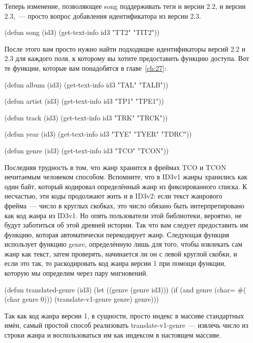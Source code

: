 Теперь изменение, позволяющее song поддерживать теги и версии 2.2, и версии 2.3,~--- просто
вопрос добавления идентификатора из версии 2.3.

\begin{myverb}
(defun song (id3) (get-text-info id3 "TT2" "TIT2"))
\end{myverb}

После этого вам просто нужно найти подходящие идентификаторы версий 2.2 и 2.3 для каждого
поля, к которому вы хотите предоставить функцию доступа. Вот те функции, которые вам
понадобятся в главе~\ref{ch:27}:

\begin{myverb}
(defun album (id3) (get-text-info id3 "TAL" "TALB"))

(defun artist (id3) (get-text-info id3 "TP1" "TPE1"))

(defun track (id3) (get-text-info id3 "TRK" "TRCK"))

(defun year (id3) (get-text-info id3 "TYE" "TYER" "TDRC"))

(defun genre (id3) (get-text-info id3 "TCO" "TCON"))
\end{myverb}

Последняя трудность в том, что жанр хранится в фреймах TCO и TCON нечи\-тае\-мым человеком
способом. Вспомните, что в ID3v1 жанры хранились как один байт, который кодировал
определённый жанр из фиксированного списка. К несчастью, эти коды продолжают жить и в
ID3v2: если текст жанрового фрейма~--- число в круглых скобках, это число обязано быть
интерпретировано как код жанра из ID3v1. Но опять пользователи этой библиотеки, вероятно,
не будут заботиться об этой древней истории. Так что вам следует предоставить им функцию,
которая автоматически перекодирует жанр. Следующая функция использует функцию genre,
определённую лишь для того, чтобы извлекать сам жанр как текст, затем проверять,
начинается ли он с левой круглой скобки, и если это так, то раскодировать код жанра версии
1 при помощи функции, которую мы определим через пару мнгновений.

\begin{myverb}
(defun translated-genre (id3)
  (let ((genre (genre id3)))
    (if (and genre (char= #\bslash{}( (char genre 0)))
      (translate-v1-genre genre)
      genre)))
\end{myverb}

Так как код жанра версии 1, в сущности, просто индекс в массиве стандартных имён, самый
простой способ реализовать translate-v1-genre~--- извлечь число из строки жанра и
воспользоваться им как индексом в настоящем массиве.


